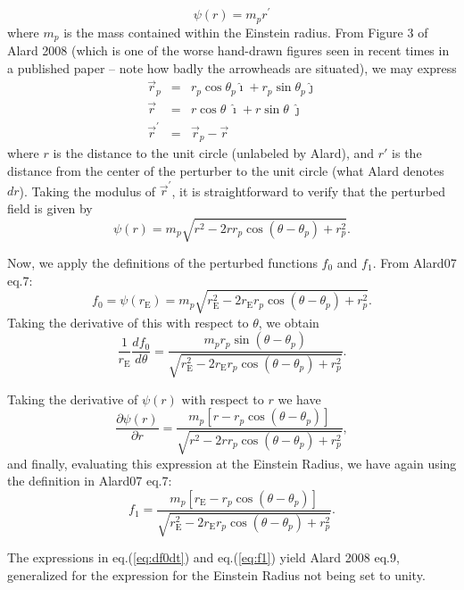 \documentclass[a4paper,twoside]{article}
\def \re {r_{\mathrm{E}}}
\def \te {\theta}
\def \tep {\theta_p}
\def \prtl {\partial}
\begin{document}
\begin{equation}
\psi(r)=m_p r^\prime
\end{equation}
where $m_p$ is the mass contained within the Einstein radius. From Figure 3 of Alard 2008 (which is one of the worse hand-drawn figures seen in recent times in a published paper -- note how badly the arrowheads are situated), we may express
\begin{eqnarray}
\vec{r}_p&=&r_p\cos{\tep}\hat{\imath} + r_p\sin{\tep}\hat{\jmath}\\
\vec{r}&=&r\cos{\te} \; \hat{\imath} + r\sin{\te}\; \hat{\jmath}\\
\vec{r}^\prime&=&\vec{r}_p-\vec{r}
\end{eqnarray}
where $r$ is the distance to the unit circle (unlabeled by Alard), and $r'$ is the distance from the center of the perturber to the unit circle (what Alard denotes $dr$).
Taking the modulus of $\vec{r}^\prime$, it is straightforward to verify that
the perturbed field is given by
\begin{equation}
\psi(r)=m_p\sqrt{r^2-2r r_p\cos{(\te-\tep)}+r^2_p}.
\end{equation} 

Now, we apply the definitions of the perturbed functions $f_0$ and $f_1$. From Alard07 eq.7:
\begin{equation}
f_0=\psi(\re)=m_p \sqrt{\re^2-2\re r_p\cos{(\te-\tep)}+r^2_p}.
\end{equation}
Taking the derivative of this with respect to $\te$, we obtain
\begin{equation}
\label{eq:df0dt}
\frac{1}{\re}\frac{d f_0}{d\te}=\frac{m_p r_p \sin{(\te -\tep)}}{\sqrt{\re^2-2\re r_p\cos{(\te-\tep)}+r^2_p}}.
\end{equation}

Taking the derivative of $\psi(r)$ with respect to $r$ we have
\begin{equation*}
\frac{\prtl  \psi(r)}{\prtl r}=\frac{m_p[r-r_p\cos{(\te-\tep)}]}{\sqrt{r^2-2r r_p\cos{(\te-\tep)}+r^2_p}},
\end{equation*}
and finally, evaluating this expression at the Einstein Radius, we have again using the definition in Alard07 eq.7:
\begin{equation}
\label{eq:f1}
f_1=\frac{m_p[\re-r_p\cos{(\te-\tep)}]}{\sqrt{\re^2-2\re r_p\cos{(\te-\tep)}+r^2_p}}.
\end{equation}

The expressions in eq.(\ref{eq:df0dt}) and eq.(\ref{eq:f1}) yield Alard 2008 eq.9, generalized for the expression for the Einstein Radius not being set to unity.
\end{document}
